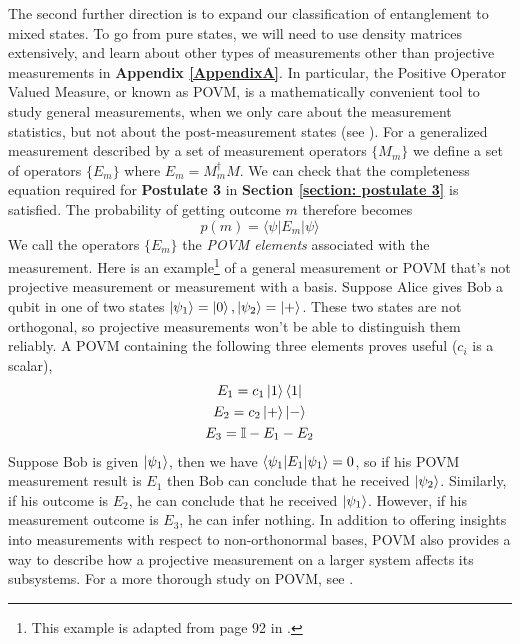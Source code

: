 The second further direction is to expand our classification of entanglement to mixed states. To go from pure states, we will need to use density matrices extensively, and learn about other types of measurements other than projective measurements in \textbf{Appendix \ref{AppendixA}}. In particular, the Positive Operator Valued Measure, or known as POVM, is a mathematically convenient tool to study general measurements, when we only care about the measurement statistics, but not about the post-measurement states (see \cite{Nielsen}). For a generalized measurement described by a set of measurement operators $\{M_m\}$ we define a set of operators $\{{E_m}\}$ where
$E_m=M_m^\dagger M$. We can check that the completeness equation required for \textbf{Postulate 3} in \textbf{Section \ref{section: postulate 3}} is satisfied. The probability of getting outcome $m$ therefore becomes 
$$p(m)=\langle \psi | E_m | \psi \rangle$$
We call the operators $\{{E_m}\}$ the \textit{POVM elements} associated with the measurement.
Here is an example\footnote{This example is adapted from page 92 in \cite{Nielsen}.} of a general measurement or POVM that's not projective measurement or measurement with a basis. Suppose Alice gives Bob a qubit in one of two states $\ket{\psi_1}=\ket{0}, \ket{\psi_2}=\ket{+}$. These two states are not orthogonal, so projective measurements won't be able to distinguish them reliably. A POVM containing the following three elements proves useful ($c_i$ is a scalar),
\begin{gather}
    E_1=c_1\ket{1}\bra{1}\\
    E_2=c_2\ket{+}\ket{-}\\
    E_3=\mathbb{I}-E_1-E_2
\end{gather}
Suppose Bob is given $\ket{\psi_1}$, then we have $\braket{\psi_1|E_1|\psi_1}=0$, so if his POVM measurement result is $E_1$ then Bob can conclude that he received $\ket{\psi_2}$. Similarly, if his outcome is $E_2$, he can conclude that he received $\ket{\psi_1}$. However, if his measurement outcome is $E_3$, he can infer nothing. In addition to offering insights into measurements with respect to non-orthonormal bases, POVM also provides a way to describe how a projective measurement on a larger system affects its subsystems. For a more thorough study on POVM, see \cite{brandt1999positive}.




